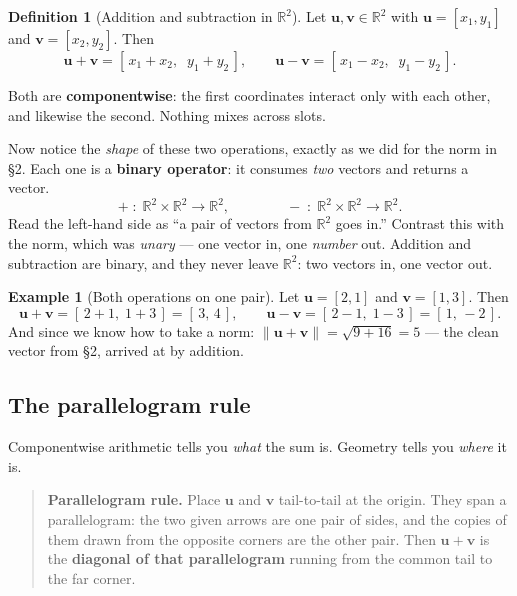 \documentclass[11pt]{article}
\theoremstyle{definition}
\newtheorem{defn}{Definition}
\newtheorem{ex}{Example}
\theoremstyle{remark}
\newcommand{\R}{\mathbb{R}}
\newcommand{\vc}[1]{\mathbf{#1}}
\newcommand{\norm}[1]{\lVert #1\rVert}
\begin{document}
\begin{defn}[Addition and subtraction in $\R^2$]
Let $\vc{u},\vc{v}\in\R^{2}$ with $\vc{u}=[x_1,y_1]$ and $\vc{v}=[x_2,y_2]$.
Then
\[
  \vc{u}+\vc{v}=[\,x_1+x_2,\;\;y_1+y_2\,],
  \qquad
  \vc{u}-\vc{v}=[\,x_1-x_2,\;\;y_1-y_2\,].
\]
\end{defn}

\noindent Both are \textbf{componentwise}: the first coordinates interact only
with each other, and likewise the second. Nothing mixes across slots.

\smallskip
\noindent Now notice the \emph{shape} of these two operations, exactly as we did
for the norm in \S2. Each one is a \textbf{binary operator}: it consumes
\emph{two} vectors and returns a vector.
\[
  +\;:\;\R^{2}\times\R^{2}\to\R^{2},
  \qquad\qquad
  -\;:\;\R^{2}\times\R^{2}\to\R^{2}.
\]
Read the left-hand side as ``a pair of vectors from $\R^{2}$ goes in.'' Contrast
this with the norm, which was \emph{unary} --- one vector in, one \emph{number}
out. Addition and subtraction are binary, and they never leave $\R^{2}$: two
vectors in, one vector out.

\begin{ex}[Both operations on one pair]
Let $\vc{u}=[2,1]$ and $\vc{v}=[1,3]$. Then
\[
  \vc{u}+\vc{v}=[\,2+1,\;1+3\,]=[\,3,\,4\,],
  \qquad
  \vc{u}-\vc{v}=[\,2-1,\;1-3\,]=[\,1,\,-2\,].
\]
And since we know how to take a norm: $\norm{\vc{u}+\vc{v}}=\sqrt{9+16}=5$ ---
the clean vector from \S2, arrived at by addition.
\end{ex}

\subsection{The parallelogram rule}
Componentwise arithmetic tells you \emph{what} the sum is. Geometry tells you
\emph{where} it is.

\begin{quote}
\textbf{Parallelogram rule.} Place $\vc{u}$ and $\vc{v}$ tail-to-tail at the
origin. They span a parallelogram: the two given arrows are one pair of sides,
and the copies of them drawn from the opposite corners are the other pair. Then
$\vc{u}+\vc{v}$ is the \textbf{diagonal of that parallelogram} running from the
common tail to the far corner.
\end{quote}
\end{document}
